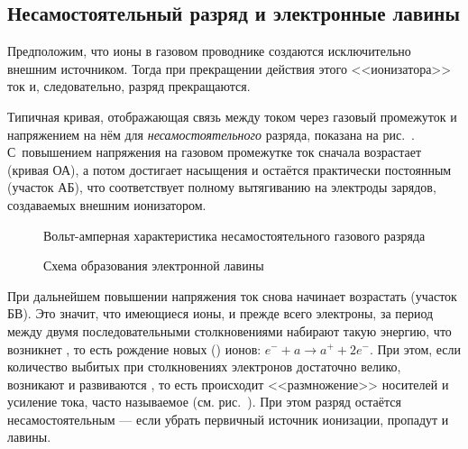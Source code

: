 \begin{labsupplement}
\subsection*{Несамостоятельный разряд и электронные лавины}
Предположим, что ионы в газовом проводнике создаются исключительно внешним
источником. Тогда при прекращении действия этого <<ионизатора>> ток и,
следовательно, разряд прекращаются.

Типичная кривая, отображающая связь между током через газовый промежуток и
напряжением на нём для \emph{несамостоятельного} разряда, показана на
рис.~. С~повышением напряжения
на газовом промежутке ток сначала возрастает (кривая ОА), а потом достигает
насыщения и остаётся практически постоянным (участок АБ), что соответствует
полному вытягиванию на электроды зарядов, создаваемых внешним ионизатором.

\begin{figure}[h]
    \centering
    \caption{Вольт-амперная характеристика несамостоятельного газового разряда}
\end{figure}

\begin{figure}[h]
    \centering
    \caption{Схема образования электронной лавины}
\end{figure}

При дальнейшем повышении напряжения ток снова начинает возрастать (участок БВ).
Это значит, что имеющиеся ионы, и прежде всего электроны, за период между двумя
последовательными столкновениями набирают такую энергию, что возникнет
, то есть рождение новых 
() ионов: $e^{-}+a\to a^{+} + 2 e^{-}$. При этом,
если количество выбитых при столкновениях электронов достаточно велико,
возникают и развиваются ,
то есть происходит <<размножение>> носителей и усиление тока,
часто называемое  (см. рис.~).
При этом разряд остаётся несамостоятельным --- если убрать первичный источник
ионизации, пропадут и лавины.




\end{labsupplement}
